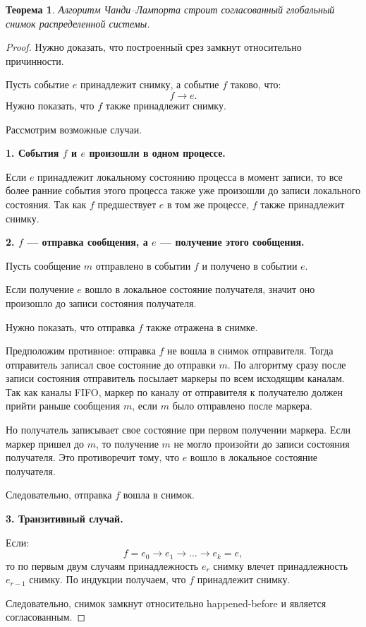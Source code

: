 \documentclass[12pt,a4paper]{article}
\newtheorem{theorem}{Теорема}
\begin{document}
\begin{theorem}
Алгоритм Чанди--Лампорта строит согласованный глобальный снимок распределенной системы.
\end{theorem}

\begin{proof}
Нужно доказать, что построенный срез замкнут относительно причинности.

Пусть событие $e$ принадлежит снимку, а событие $f$ таково, что:
\[
f \rightarrow e.
\]
Нужно показать, что $f$ также принадлежит снимку.

Рассмотрим возможные случаи.

\textbf{1. События $f$ и $e$ произошли в одном процессе.}

Если $e$ принадлежит локальному состоянию процесса в момент записи, то все более ранние события этого процесса также уже произошли до записи локального состояния. Так как $f$ предшествует $e$ в том же процессе, $f$ также принадлежит снимку.

\textbf{2. $f$ --- отправка сообщения, а $e$ --- получение этого сообщения.}

Пусть сообщение $m$ отправлено в событии $f$ и получено в событии $e$.

Если получение $e$ вошло в локальное состояние получателя, значит оно произошло до записи состояния получателя.

Нужно показать, что отправка $f$ также отражена в снимке.

Предположим противное: отправка $f$ не вошла в снимок отправителя. Тогда отправитель записал свое состояние до отправки $m$. По алгоритму сразу после записи состояния отправитель посылает маркеры по всем исходящим каналам. Так как каналы FIFO, маркер по каналу от отправителя к получателю должен прийти раньше сообщения $m$, если $m$ было отправлено после маркера.

Но получатель записывает свое состояние при первом получении маркера. Если маркер пришел до $m$, то получение $m$ не могло произойти до записи состояния получателя. Это противоречит тому, что $e$ вошло в локальное состояние получателя.

Следовательно, отправка $f$ вошла в снимок.

\textbf{3. Транзитивный случай.}

Если:
\[
f = e_0 \rightarrow e_1 \rightarrow \dots \rightarrow e_k = e,
\]
то по первым двум случаям принадлежность $e_r$ снимку влечет принадлежность $e_{r-1}$ снимку. По индукции получаем, что $f$ принадлежит снимку.

Следовательно, снимок замкнут относительно happened-before и является согласованным.
\end{proof}
\end{document}
